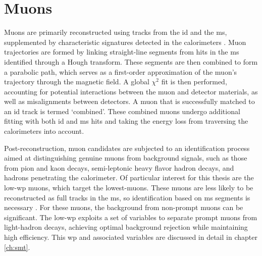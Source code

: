 \section{Muons}
Muons are primarily reconstructed using tracks from the \ac{id} and the \ac{ms}, supplemented by characteristic signatures detected in the calorimeters \citep{ATLAS-CONF-2020-030}. Muon trajectories are formed by linking straight-line segments from hits in the \ac{ms} identified through a Hough transform. These segments are then combined to form a parabolic path, which serves as a first-order approximation of the muon's trajectory through the magnetic field. A global $\chi^2$ fit is then performed, accounting for potential interactions between the muon and detector materials, as well as misalignments between detectors. A muon that is successfully matched to an \ac{id} track is termed `combined'. These combined muons undergo additional fitting with both \ac{id} and \ac{ms} hits and taking the energy loss from traversing the calorimeters into account.

Post-reconstruction, muon candidates are subjected to an identification process aimed at  distinguishing genuine muons from background signals, such as those from pion and kaon decays, semi-leptonic heavy flavor hadron decays, and hadrons penetrating the calorimeter. Of particular interest for this thesis are the low-\pt \ac{wp} muons, which target the lowest-\pt muons. These muons are less likely to be reconstructed as full tracks in the \ac{ms}, so identification based on \ac{ms} segments is necessary \citep{ATL-PHYS-PUB-2020-002}. For these muons, the background from non-prompt muons can be significant. The low-\pt \ac{wp} exploits a set of variables to separate prompt muons from light-hadron decays, achieving optimal background rejection while maintaining high efficiency. This \ac{wp} and associated variables are discussed in detail in chapter \ref{ch:smt}.